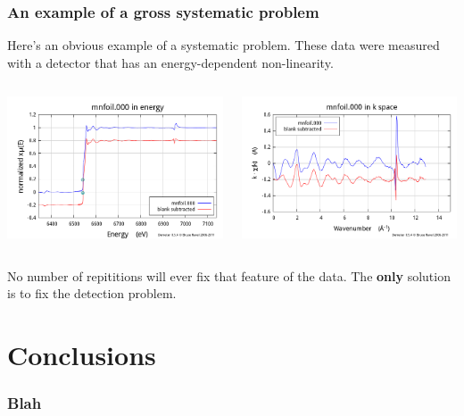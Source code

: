 \documentclass[10pt, xcolor=x11names, compress]{beamer}
\begin{document}
\begin{frame}
  \frametitle{An example of a gross systematic problem}

  Here's an obvious example of a systematic problem.  These data were
  measured with a detector that has an energy-dependent non-linearity.

  \begin{columns}[T]
    \begin{column}{0.5\linewidth}
      \includegraphics[width=\linewidth]{images/mnxmu.png}      
    \end{column}
    \begin{column}{0.5\linewidth}
      \includegraphics[width=\linewidth]{images/mnchik.png}      
    \end{column}
  \end{columns}

  \bigskip

  \begin{alertblock}{}
    No number of repititions will ever fix that feature of the data.
    The \textbf{only} solution is to fix the detection problem.
  \end{alertblock}
\end{frame}

\section{Conclusions}

\begin{frame}
  \frametitle{Blah}
  
\end{frame}
\end{document}
